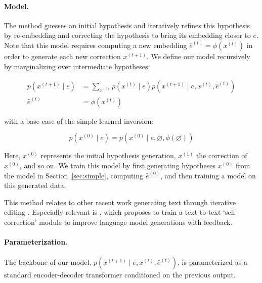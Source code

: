 \documentclass[11pt]{article}
\begin{document}

\paragraph{Model.} The method guesses an initial hypothesis and iteratively refines this hypothesis by re-embedding and correcting the hypothesis to bring its embedding closer to $e$. Note that this model requires computing a new embedding  $\hat{e}^{(t)}= \phi(x^{(t)})$ in order to generate each new correction $x^{(t+1)}$. We define our model recursively by marginalizing over intermediate hypotheses:

\begin{align*}
    p(x^{(t+1)} \mid e) &= \sum_{x^{(t)}}  p(x^{(t)} \mid e) p(x^{(t+1)} \mid e, x^{(t)}, \hat{e}^{(t)})\\
    \hat{e}^{(t)} &= \phi(x^{(t)})
\end{align*}

\noindent with a base case of the simple learned inversion:

\[
p(x^{(0)} \mid e) = p(x^{(0)} \mid e, \varnothing, \phi(\varnothing))
\]

\noindent %
Here, $x^{(0)}$ represents the initial hypothesis generation, $x^{(1)}$ the correction of $x^{(0)}$, and so on. We train this model by first generating hypotheses $x^{(0)}$ from the model in Section~\ref{sec:simple}, computing $\hat{e}^{(0)}$,  and then training a model on this generated data.

This method relates to other recent work generating text through iterative editing \cite{lee2018deterministic, ghazvininejad2019maskpredict}. Especially relevant is \citet{welleck2022generating}, which proposes to train a text-to-text `self-correction' module to improve language model generations with feedback. %



\paragraph{Parameterization.} The backbone of our model, $p(x^{(t+1)} \mid e, x^{(t)}, \hat{e}^{(t)})$, is parameterized as a standard encoder-decoder transformer \cite{vaswani2017attention,raffel2020t5} conditioned on the previous output.
\end{document}
